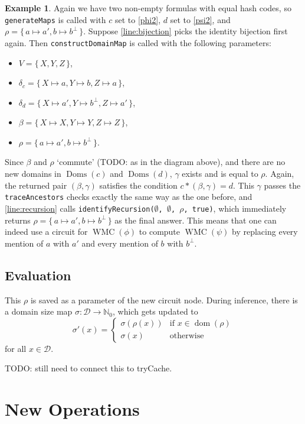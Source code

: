 \documentclass{article}
\theoremstyle{definition}
\newtheorem{example}{Example}
\DeclareMathOperator{\dom}{dom}
\DeclareMathOperator{\Doms}{Doms}
\DeclareMathOperator{\WMC}{WMC}
\begin{document}
\begin{example}
  Again we have two non-empty formulas with equal hash codes, so \texttt{generateMaps} is called with $c$ set to \cref{phi2}, $d$ set to \cref{psi2}, and $\rho = \{\, a \mapsto a', b \mapsto b^\bot \,\}$. Suppose \cref{line:bijection} picks the identity bijection first again. Then \texttt{constructDomainMap} is called with the following parameters:
  \begin{itemize}
  \item $V = \{\, X, Y, Z \,\}$,
  \item $\delta_c = \{\, X \mapsto a, Y \mapsto b, Z \mapsto a \,\}$,
  \item $\delta_d = \{\, X \mapsto a', Y \mapsto b^\bot, Z \mapsto a' \,\}$,
  \item $\beta = \{\, X \mapsto X, Y \mapsto Y, Z \mapsto Z \,\}$,
  \item $\rho = \{\, a \mapsto a', b \mapsto b^\bot \,\}$.
  \end{itemize}
  Since $\beta$ and $\rho$ `commute' (TODO: as in the diagram above), and there are no new domains in $\Doms(c)$ and $\Doms(d)$, $\gamma$ exists and is equal to $\rho$. Again, the returned pair $(\beta, \gamma)$ satisfies the condition $c \ast (\beta, \gamma) = d$. This $\gamma$ passes the \texttt{traceAncestors} checks exactly the same way as the one before, and \cref{line:recursion} calls \texttt{identifyRecursion($\emptyset$, $\emptyset$, $\rho$, true)}, which immediately returns $\rho = \{\, a \mapsto a', b \mapsto b^\bot \,\}$ as the final answer. This means that one can indeed use a circuit for $\WMC(\phi)$ to compute $\WMC(\psi)$ by replacing every mention of $a$ with $a'$ and every mention of $b$ with $b^\bot$.
\end{example}

\subsection{Evaluation}

This $\rho$ is saved as a parameter of the new circuit node. During inference, there is a domain size map $\sigma\colon \mathscr{D} \to \mathbb{N}_0$, which gets updated to
\[
\sigma'(x) =
\begin{cases}
  \sigma(\rho(x)) & \text{if } x \in \dom(\rho) \\
  \sigma(x) & \text{otherwise}
\end{cases}
\]
for all $x \in \mathscr{D}$.

TODO: still need to connect this to tryCache.

\section{New Operations}
\end{document}
